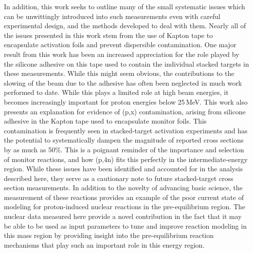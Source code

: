 In addition, this work seeks to outline many of the small systematic issues which can be unwittingly introduced into such measurements even with careful experimental design, and the methods developed to deal with them.
Nearly all of the issues presented in this work stem from the use of Kapton tape to encapsulate activation foils and prevent dispersible contamination.
One major result from this work has been an increased appreciation for the role played by the silicone adhesive on this tape used to contain the individual stacked targets in these measurements. 
While this might seem obvious, the contributions to the slowing of the beam due to the adhesive has often been neglected in much work performed to date. 
While this plays a limited role at high beam energies, it becomes increasingly important for proton energies below 25\,MeV. 
This work also presents an explanation for evidence of (p,x) contamination, arising from silicone adhesive in the Kapton tape used to encapsulate monitor foils. 
This contamination is frequently seen in stacked-target activation experiments and has the potential to systematically dampen the magnitude of reported cross sections by as much as 50\%. 
This is a poignant reminder of the importance and selection of monitor reactions, and how (p,4n) fits this perfectly in the intermediate-energy region.
While these issues have been identified and accounted for in the analysis described here, they serve as a cautionary note to future stacked-target cross section measurements.
In addition to the novelty of advancing basic science, the measurement of these reactions provides an example of the poor current state of modeling for proton-induced nuclear reactions in the pre-equilibrium region.
The nuclear data measured here provide a novel contribution in the fact that it may be able to be used as input parameters to tune and improve reaction modeling in this mass region by providing insight into the pre-equilibrium reaction mechanisms that play such an important role in this energy region.





